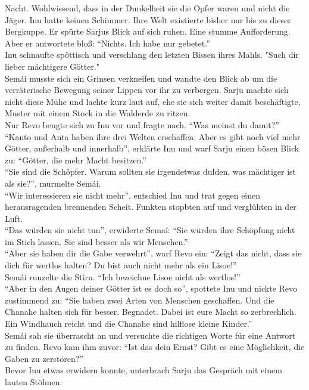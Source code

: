 Nacht. Wohlwissend, dass in der Dunkelheit sie die Opfer waren und nicht die Jäger. Inu hatte 
keinen Schimmer. Ihre Welt existierte bisher nur bis zu dieser Bergkuppe. Er spürte Sarjus Blick 
auf sich ruhen. Eine stumme Aufforderung. Aber er antwortete bloß: ``Nichts. Ich habe nur 
gebetet.''\\
Inu schnaufte spöttisch und verschlang den letzten Bissen ihres Mahls. "Such dir lieber mächtigere 
Götter."\\
Semái musste sich ein Grinsen verkneifen und wandte den Blick ab um die verräterische Bewegung 
seiner Lippen vor ihr zu verbergen. Sarju machte sich nicht diese Mühe und lachte kurz laut auf, 
ehe sie sich weiter damit beschäftigte, Muster mit einem Stock in die Walderde zu ritzen.\\
Nur Revo beugte sich zu Inu vor und fragte nach. ``Was meinst du damit?''\\
``Kanto und Anta haben ihre drei Welten erschaffen. Aber es gibt noch viel mehr Götter, außerhalb 
und innerhalb'', erklärte Inu und warf Sarju einen bösen Blick zu: ``Götter, die mehr Macht 
besitzen.''\\
``Sie sind die Schöpfer. Warum sollten sie irgendetwas dulden, was mächtiger ist als sie?'', 
murmelte Semái.\\
``Wir interessieren sie nicht mehr'', entschied Inu und trat gegen einen herausragenden 
brennenden Scheit. Funkten stopbten auf und verglühten in der Luft.\\
``Das würden sie nicht tun'', erwiderte Semaí: ``Sie würden ihre Schöpfung nicht im Stich 
lassen. Sie sind besser als wir Menschen.''\\
``Aber sie haben dir die Gabe verwehrt'', warf Revo ein: ``Zeigt das nicht, dass sie dich für 
wertlos halten? Du bist auch nicht mehr als ein Lisoe!''\\
Semái runzelte die Stirn. ``Ich bezeichne Lisoe nicht als wertlos!''\\
``Aber in den Augen deiner Götter ist es doch so'', spottete Inu und nickte Revo zustimmend zu: 
``Sie haben zwei Arten von Menschen geschaffen. Und die Chanahe halten sich für besser. Begnadet. 
Dabei ist eure Macht so zerbrechlich. Ein Windhauch reicht und die Chanahe sind hilflose kleine 
Kinder.''\\
Semái sah sie überrascht an und versuchte die richtigen Worte für eine Antwort zu finden. Revo kam 
ihm zuvor: ``Ist das dein Ernst? Gibt es eine Möglichkeit, die Gaben zu zerstören?''\\
Bevor Inu etwas erwidern konnte, unterbrach Sarju das Gespräch mit einem lauten Stöhnen. 
